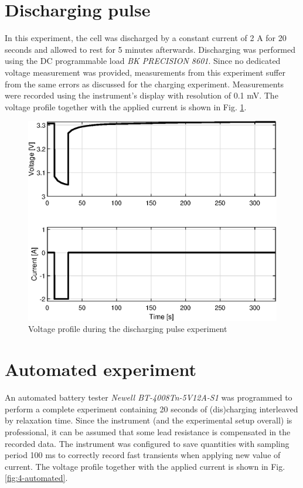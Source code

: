 \section{Discharging pulse}
In this experiment, the cell was discharged by a constant current of 2 A for 20 seconds and allowed to rest for 5 minutes afterwards.
Discharging was performed using the DC programmable load \textit{BK PRECISION 8601}. Since no dedicated voltage measurement was provided, measurements from this experiment suffer from the same errors as discussed for the charging experiment. Measurements were recorded using the instrument's display with resolution of 0.1 mV.
The voltage profile together with the applied current is shown in Fig. \ref{fig:4-discharging}.


\begin{figure}[htbp]
    \centering
    \includegraphics{figures/4/discharge.eps}
    \caption{Voltage profile during the discharging pulse experiment}
    \label{fig:4-discharging}
\end{figure}

\section{Automated experiment}
An automated battery tester \textit{Newell BT-4008Tn-5V12A-S1} was programmed to perform a complete experiment containing 20 seconds of (dis)charging interleaved by relaxation time. Since the instrument (and the experimental setup overall) is professional, it can be assumed that some lead resistance is compensated in the recorded data. The instrument was configured to save quantities with sampling period 100 ms to correctly record fast transients when applying new value of current. The voltage profile together with the applied current is shown in Fig. \ref{fig:4-automated}.

